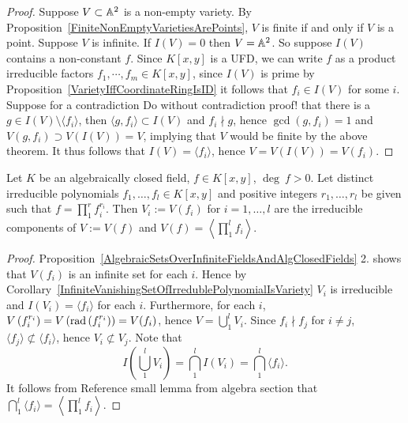 \begin{proof}
    Suppose $V\subset \mathbb{A}^2$ is a non-empty variety. By Proposition~\ref{FiniteNonEmptyVarietiesArePoints}, $V$ is finite if and only if $V$ is a point. Suppose $V$ is infinite. If $I(V) = 0$ then $V= \mathbb{A}^2$. So suppose $I(V)$ contains a non-constant $f$. Since $K[x,y]$ is a UFD, we can write $f$ as a product irreducible factors $f_1,\cdots, f_m\in K[x,y]$, since $I(V)$ is prime by Proposition~\ref{VarietyIffCoordinateRingIsID} it follows that $f_i\in I(V)$ for some $i$. Suppose for a contradiction {\LARGE Do without contradiction proof!} that there is a $g\in I(V)\setminus \langle f_i\rangle$, then $\langle g,f_i\rangle \subset I(V)$ and $f_i\nmid g$, hence $\gcd(g,f_i)=1$ and $V(g,f_i)\supset V(I(V))=V$, implying that $V$ would be finite by the above theorem. It thus follows that $I(V)=\langle f_i\rangle$, hence $V=V(I(V))=V(f_i)$. 
\end{proof}
\begin{corollary}
    Let $K$ be an algebraically closed field, $f\in K[x,y]$, $\deg \ f >0$. Let distinct irreducible polynomials $f_1,\dots,f_l\in K[x,y]$ and positive integers $r_1,\dots,r_l$ be given such that $f =  \prod_1^r f_i^{r_i}$. Then $V_i:= V(f_i)$ for $i=1,\dots,l$ are the irreducible components of $V:=V(f)$ and $V(f)=\left\langle \prod_1^l f_i \right\rangle$. 
\end{corollary}
\begin{proof}
    Proposition~\ref{AlgebraicSetsOverInfiniteFieldsAndAlgClosedFields} 2. shows that $V(f_i)$ is an infinite set for each $i$. Hence by Corollary~\ref{InfiniteVanishingSetOfIrredublePolynomialIsVariety} $V_i$ is irreducible and $I(V_i)=\langle f_i\rangle$ for each $i$. Furthermore, for each $i$, $V\left(f_i^{r_i}\right)= V\left(\mathrm{rad}\left(f_i^{r_i}\right)\right) = V(f_i)$, hence $V = \bigcup_1^l V_i$. Since $f_i\nmid f_j$ for $i\neq j$, $\langle f_j\rangle \not\subset \langle f_i\rangle$, hence $V_i\not\subset V_j$. Note that 
    $$I\left(\bigcup_1^l V_i\right) = \bigcap_1^l I(V_i)= \bigcap_1^l \langle f_i\rangle.$$
    It follows from {\Large Reference small lemma from algebra section} that $\bigcap_1^l \langle f_i\rangle = \left\langle \prod_1^l f_i\right\rangle$.
\end{proof}
